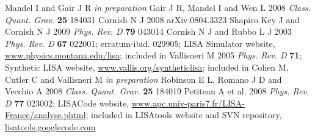 \documentclass{iopart}
\begin{document}
\begin{thebibliography}{99}
%
 Mandel I and Gair J R \textit{in preparation}
%
 Gair J R, Mandel I and Wen L 2008 \textit{Class. Quant. Grav.} \textbf{25} 184031
%
 Cornish N J 2008 arXiv:0804.3323
%
 Shapiro Key J and Cornish N J 2009 \textit{Phys. Rev. D} \textbf{79} 043014
%
 Cornish N J and Rubbo L J 2003 \textit{Phys. Rev. D} \textbf{67} 022001; erratum-ibid. 029905; LISA Simulator website, \url{www.physics.montana.edu/lisa}; included in \cite{lisatools}
%
 Vallisneri M 2005 \textit{Phys. Rev. D} \textbf{71}; Synthetic LISA website, \url{www.vallis.org/syntheticlisa}; included in \cite{lisatools}
%
 Cohen M, Cutler C and Vallisneri M \textit{in preparation}
%
 Robinson E L, Romano J D and Vecchio A 2008 \textit{Class. Quant. Grav.} \textbf{25} 184019 
%
 Petiteau A et al. 2008 \textit{Phys. Rev. D} \textbf{77} 023002; LISACode website, \url{www.apc.univ-paris7.fr/LISA-France/analyse.phtml}; included in \cite{lisatools}
%
 LISAtools website and SVN repository, \url{lisatools.googlecode.com}

\end{thebibliography}
\end{document}

